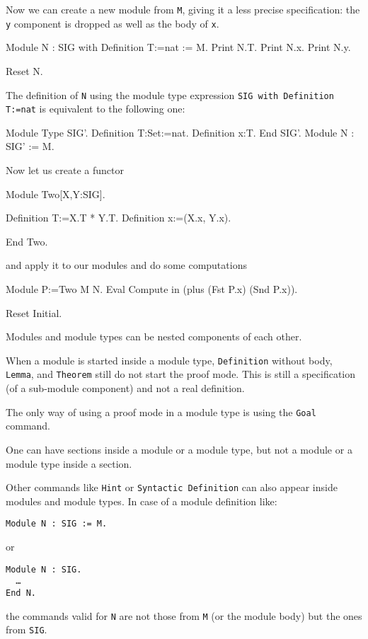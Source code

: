 Now we can create a new module from \texttt{M}, giving it a less
precise specification: the \texttt{y} component is dropped as well
as the body of \texttt{x}.
\begin{coq_example}
Module N  :  SIG with Definition T:=nat  :=  M.
Print N.T.
Print N.x.
Print N.y.
\end{coq_example}
\begin{coq_eval}
Reset N.
\end{coq_eval}
The definition of \texttt{N} using the module type expression
\texttt{SIG with Definition T:=nat} is equivalent to the following
one:
\begin{coq_example*}
Module Type SIG'.
  Definition T:Set:=nat.
  Definition x:T.
End SIG'.
Module N : SIG' := M.
\end{coq_example*}
Now let us create a functor
\begin{coq_example}
Module Two[X,Y:SIG].
\end{coq_example}
\begin{coq_example*}
  Definition T:=X.T * Y.T.
  Definition x:=(X.x, Y.x).
\end{coq_example*}
\begin{coq_example}
End Two.
\end{coq_example}
and apply it to our modules and do some computations
\begin{coq_example}
Module P:=Two M N.
Eval Compute in (plus (Fst P.x) (Snd P.x)).
\end{coq_example}
\begin{coq_eval}
Reset Initial.
\end{coq_eval}

\begin{Remarks}
\item Modules and module types can be nested components of each other.
\item When a module is started inside a module type,
  \texttt{Definition} without body, \texttt{Lemma}, and
  \texttt{Theorem} still do not start the proof mode.  This is still a
  specification (of a sub-module component) and not a real definition.
\item The only way of using a proof mode in a module type is using the 
  \texttt{Goal} command.
\item One can have sections inside a module or a module type, but
  not a module or a module type inside a section.
\item Other commands like \texttt{Hint} or \texttt{Syntactic
    Definition} can also appear inside modules and module types. In
    case of a module definition like:

    \medskip
    \noindent
    {\tt Module N : SIG := M.} 
    \medskip

    or

    \medskip
    {\tt Module N : SIG.\\
      \ \ \dots\\
      End N.}
    \medskip 

    the commands valid for \texttt{N} are not those from
    \texttt{M} (or the module body) but the ones from \texttt{SIG}.

\end{Remarks}


